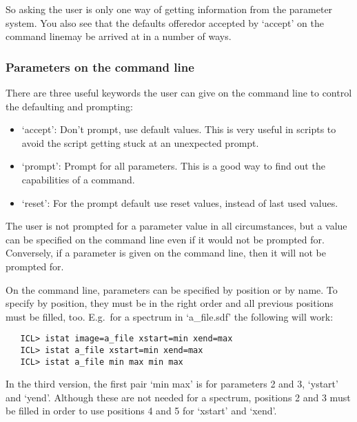    So asking the user is only one way of getting information from the
   parameter system. You also see that the defaults offered\latorhtm{---}{-}or
   accepted by `accept' on the command line\latorhtm{---}{-}may be arrived
   at in a number of ways.


\subsubsection{\label{paramsonline}Parameters on the command line}

   There are three useful keywords the user can give on the command line
   to control the defaulting and prompting:

\begin{itemize}
\item
   `accept': Don't prompt, use default values. This is very useful in
   scripts to avoid the script getting stuck at an unexpected prompt.
\item
   `prompt': Prompt for all parameters. This is a good way to find out
   the capabilities of a command.
\item
   `reset': For the prompt default use reset values, instead of last
   used values.
\end{itemize}

   The user is not prompted for a parameter value in all circumstances,
   but a value can be specified on the command line even if it would not
   be prompted for.  Conversely, if a parameter is given on the command
   line, then it will not be prompted for.

   On the command line, parameters can be specified by position or by
   name. To specify by position, they must be in the right order and all
   previous positions must be filled, too. E.g.\ for a spectrum in
   `a\_file.sdf' the following will work:

\begin{verbatim}
   ICL> istat image=a_file xstart=min xend=max
   ICL> istat a_file xstart=min xend=max
   ICL> istat a_file min max min max
\end{verbatim}

   In the third version, the first pair `min max' is for parameters 2
   and 3, `ystart' and `yend'. Although these are not needed for a
   spectrum, positions 2 and 3 must be filled in order to use positions
   4 and 5 for `xstart' and `xend'.

